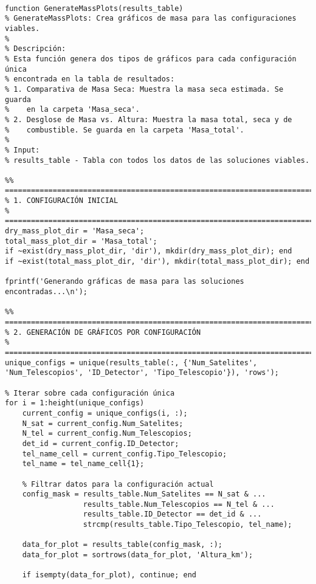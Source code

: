 \begin{verbatim}

function GenerateMassPlots(results_table)
% GenerateMassPlots: Crea gráficos de masa para las configuraciones viables.
%
% Descripción:
% Esta función genera dos tipos de gráficos para cada configuración única
% encontrada en la tabla de resultados:
% 1. Comparativa de Masa Seca: Muestra la masa seca estimada. Se guarda
%    en la carpeta 'Masa_seca'.
% 2. Desglose de Masa vs. Altura: Muestra la masa total, seca y de 
%    combustible. Se guarda en la carpeta 'Masa_total'.
%
% Input:
% results_table - Tabla con todos los datos de las soluciones viables.

%% ========================================================================
% 1. CONFIGURACIÓN INICIAL
% ========================================================================
dry_mass_plot_dir = 'Masa_seca';
total_mass_plot_dir = 'Masa_total';
if ~exist(dry_mass_plot_dir, 'dir'), mkdir(dry_mass_plot_dir); end
if ~exist(total_mass_plot_dir, 'dir'), mkdir(total_mass_plot_dir); end

fprintf('Generando gráficas de masa para las soluciones encontradas...\n');

%% ========================================================================
% 2. GENERACIÓN DE GRÁFICOS POR CONFIGURACIÓN
% ========================================================================
unique_configs = unique(results_table(:, {'Num_Satelites', 'Num_Telescopios', 'ID_Detector', 'Tipo_Telescopio'}), 'rows');

% Iterar sobre cada configuración única
for i = 1:height(unique_configs)
    current_config = unique_configs(i, :);
    N_sat = current_config.Num_Satelites;
    N_tel = current_config.Num_Telescopios;
    det_id = current_config.ID_Detector;
    tel_name_cell = current_config.Tipo_Telescopio;
    tel_name = tel_name_cell{1};

    % Filtrar datos para la configuración actual
    config_mask = results_table.Num_Satelites == N_sat & ...
                  results_table.Num_Telescopios == N_tel & ...
                  results_table.ID_Detector == det_id & ...
                  strcmp(results_table.Tipo_Telescopio, tel_name);
    
    data_for_plot = results_table(config_mask, :);
    data_for_plot = sortrows(data_for_plot, 'Altura_km');

    if isempty(data_for_plot), continue; end


\end{verbatim}
